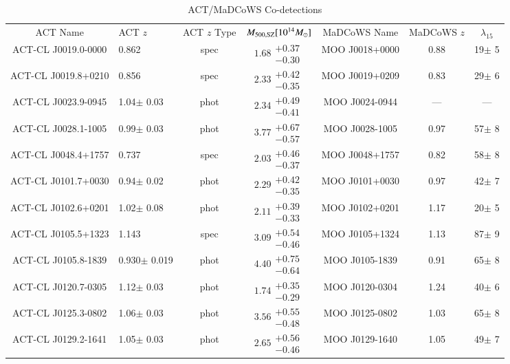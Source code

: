 \onecolumn

\begin{longtable}[p!]{clccccc}
\caption{ACT/MaDCoWS Co-detections}\\
\hline\hline\noalign{\smallskip}
ACT Name & ACT $z$ & ACT $z$ Type & $M_{\rm 500,SZ} [10^{14}M_\odot]$ & MaDCoWS Name & MaDCoWS $z$ & $\lambda_{15}$\\\noalign{\smallskip}
\hline\noalign{\smallskip}
ACT-CL J0019.0-0000 & 0.862& spec & $1.68\substack{+0.37\\-0.30}$ & MOO J0018+0000 & 0.88 & 19$\pm$ 5 \\
ACT-CL J0019.8+0210 & 0.856& spec & $2.33\substack{+0.42\\-0.35}$ & MOO J0019+0209 & 0.83 & 29$\pm$ 6 \\
ACT-CL J0023.9-0945 & 1.04$\pm$ 0.03 & phot & $2.34\substack{+0.49\\-0.41}$ & MOO J0024-0944 & --- & ---\\
ACT-CL J0028.1-1005 & 0.99$\pm$ 0.03 & phot & $3.77\substack{+0.67\\-0.57}$ & MOO J0028-1005 & 0.97 & 57$\pm$ 8 \\
ACT-CL J0048.4+1757 & 0.737& spec & $2.03\substack{+0.46\\-0.37}$ & MOO J0048+1757 & 0.82 & 58$\pm$ 8 \\
ACT-CL J0101.7+0030 & 0.94$\pm$ 0.02 & phot & $2.29\substack{+0.42\\-0.35}$ & MOO J0101+0030 & 0.97 & 42$\pm$ 7 \\
ACT-CL J0102.6+0201 & 1.02$\pm$ 0.08 & phot & $2.11\substack{+0.39\\-0.33}$ & MOO J0102+0201 & 1.17 & 20$\pm$ 5 \\
ACT-CL J0105.5+1323 & 1.143& spec & $3.09\substack{+0.54\\-0.46}$ & MOO J0105+1324 & 1.13 & 87$\pm$ 9 \\
ACT-CL J0105.8-1839 & 0.930$\pm$ 0.019 & phot & $4.40\substack{+0.75\\-0.64}$ & MOO J0105-1839 & 0.91 & 65$\pm$ 8 \\
ACT-CL J0120.7-0305 & 1.12$\pm$ 0.03 & phot & $1.74\substack{+0.35\\-0.29}$ & MOO J0120-0304 & 1.24 & 40$\pm$ 6 \\
ACT-CL J0125.3-0802 & 1.06$\pm$ 0.03 & phot & $3.56\substack{+0.55\\-0.48}$ & MOO J0125-0802 & 1.03 & 65$\pm$ 8 \\
ACT-CL J0129.2-1641 & 1.05$\pm$ 0.03 & phot & $2.65\substack{+0.56\\-0.46}$ & MOO J0129-1640 & 1.05 & 49$\pm$ 7 \\

\end{longtable}
